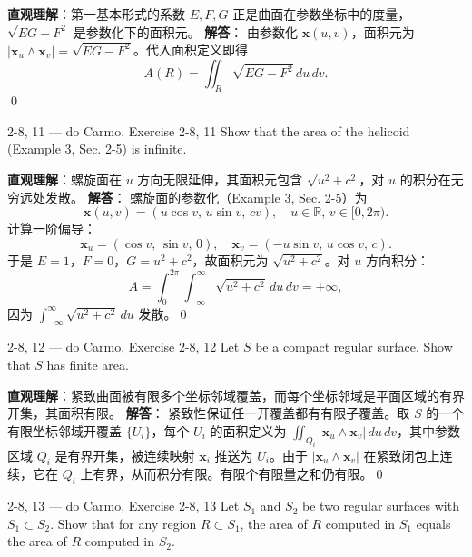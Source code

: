 \begin{solution}
\textbf{直观理解}：第一基本形式的系数 $E, F, G$ 正是曲面在参数坐标中的度量，$\sqrt{EG-F^2}$ 是参数化下的面积元。
\textbf{解答}：
由参数化 $\mathbf{x}(u, v)$，面积元为 $|\mathbf{x}_u \wedge \mathbf{x}_v| = \sqrt{EG - F^2}$。代入面积定义即得
\[
A(R) = \iint_R \sqrt{EG - F^2} \, du \, dv.
\]
\qed
\end{solution}
\begin{exercise}
{2-8, 11 — do Carmo, Exercise 2-8, 11}
Show that the area of the helicoid (Example 3, Sec. 2-5) is infinite.


\end{exercise}

\begin{solution}
\textbf{直观理解}：螺旋面在 $u$ 方向无限延伸，其面积元包含 $\sqrt{u^2 + c^2}$，对 $u$ 的积分在无穷远处发散。
\textbf{解答}：
螺旋面的参数化（Example 3, Sec. 2-5）为
\[
\mathbf{x}(u, v) = (u\cos v, \, u\sin v, \, cv), \quad u \in \mathbb{R}, \, v \in [0, 2\pi).
\]
计算一阶偏导：
\[
\mathbf{x}_u = (\cos v, \, \sin v, \, 0), \quad \mathbf{x}_v = (-u\sin v, \, u\cos v, \, c).
\]
于是 $E = 1$，$F = 0$，$G = u^2 + c^2$，故面积元为 $\sqrt{u^2 + c^2}$。对 $u$ 方向积分：
\[
A = \int_0^{2\pi} \int_{-\infty}^{\infty} \sqrt{u^2 + c^2} \, du \, dv = +\infty,
\]
因为 $\int_{-\infty}^{\infty} \sqrt{u^2 + c^2} \, du$ 发散。\qed
\end{solution}
\begin{exercise}
{2-8, 12 — do Carmo, Exercise 2-8, 12}
Let $S$ be a compact regular surface. Show that $S$ has finite area.


\end{exercise}

\begin{solution}
\textbf{直观理解}：紧致曲面被有限多个坐标邻域覆盖，而每个坐标邻域是平面区域的有界开集，其面积有限。
\textbf{解答}：
紧致性保证任一开覆盖都有有限子覆盖。取 $S$ 的一个有限坐标邻域开覆盖 $\{U_i\}$，每个 $U_i$ 的面积定义为 $\iint_{Q_i} |\mathbf{x}_u \wedge \mathbf{x}_v| \, du \, dv$，其中参数区域 $Q_i$ 是有界开集，被连续映射 $\mathbf{x}_i$ 推送为 $U_i$。由于 $|\mathbf{x}_u \wedge \mathbf{x}_v|$ 在紧致闭包上连续，它在 $Q_i$ 上有界，从而积分有限。有限个有限量之和仍有限。\qed
\end{solution}
\begin{exercise}
{2-8, 13 — do Carmo, Exercise 2-8, 13}
Let $S_1$ and $S_2$ be two regular surfaces with $S_1 \subset S_2$. Show that for any region $R \subset S_1$, the area of $R$ computed in $S_1$ equals the area of $R$ computed in $S_2$.


\end{exercise}

